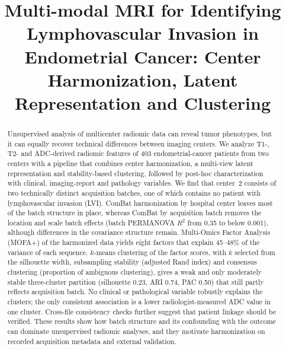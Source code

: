 \documentclass[conference]{IEEEtran}
\begin{document}
\title{Multi-modal MRI for Identifying Lymphovascular Invasion in Endometrial Cancer: Center Harmonization, Latent Representation and Clustering\\}

\author{
}

\maketitle

\begin{abstract}
Unsupervised analysis of multicenter radiomic data can reveal tumor phenotypes, but it can equally recover technical differences between imaging centers. We analyze T1-, T2- and ADC-derived radiomic features of 403 endometrial-cancer patients from two centers with a pipeline that combines center harmonization, a multi-view latent representation and stability-based clustering, followed by post-hoc characterization with clinical, imaging-report and pathology variables. We find that center~2 consists of two technically distinct acquisition batches, one of which contains no patient with lymphovascular invasion (LVI). ComBat harmonization by hospital center leaves most of the batch structure in place, whereas ComBat by acquisition batch removes the location and scale batch effects (batch PERMANOVA $R^2$ from 0.35 to below 0.001), although differences in the covariance structure remain. Multi-Omics Factor Analysis (MOFA+) of the harmonized data yields eight factors that explain 45--48\% of the variance of each sequence. $k$-means clustering of the factor scores, with $k$ selected from the silhouette width, subsampling stability (adjusted Rand index) and consensus clustering (proportion of ambiguous clustering), gives a weak and only moderately stable three-cluster partition (silhouette 0.23, ARI 0.74, PAC 0.50) that still partly reflects acquisition batch. No clinical or pathological variable robustly explains the clusters; the only consistent association is a lower radiologist-measured ADC value in one cluster. Cross-file consistency checks further suggest that patient linkage should be verified. These results show how batch structure and its confounding with the outcome can dominate unsupervised radiomic analyses, and they motivate harmonization on recorded acquisition metadata and external validation.
\end{abstract}
\end{document}
